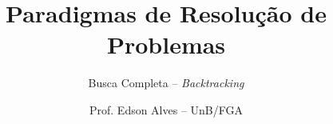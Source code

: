 \title{Paradigmas de Resolução de Problemas}
\subtitle{Busca Completa -- {\it Backtracking}}
\author{Prof. Edson Alves -- UnB/FGA}
\date{}
